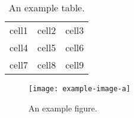 \documentclass{thesis}
\begin{document}
\begin{table}[h]
    \begin{center}
        \begin{tabular}{ c c c }
         cell1 & cell2 & cell3 \\ 
         cell4 & cell5 & cell6 \\  
         cell7 & cell8 & cell9    
        \end{tabular}
    \end{center}
    \caption{An example table. \lipsum[1]}
    \label{tab:1}
    \end{table}
    
    \begin{figure}[h]
        \centering
        \texttt{[image: example-image-a]}
        \caption{An example figure. \lipsum[1]}
        \label{fig:1}
    \end{figure}



\renewcommand{\baselinestretch}{1}
\normalsize
{}


\end{document}
